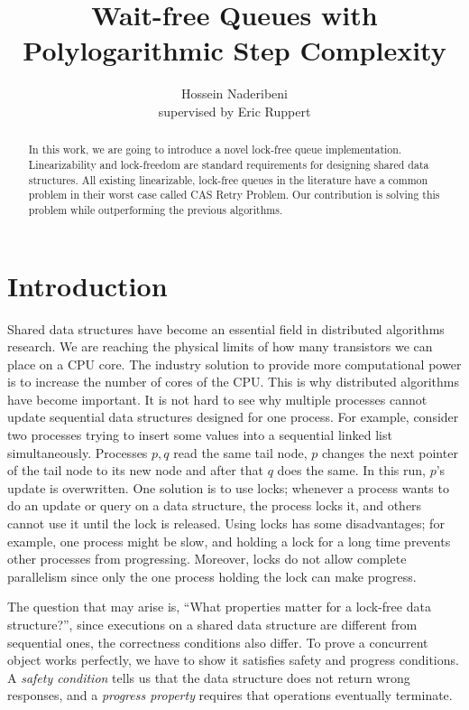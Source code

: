 \documentclass[10pt]{article}
\theoremstyle{definition}
\begin{document}
\title{Wait-free Queues with Polylogarithmic Step Complexity}
\author{Hossein Naderibeni \\supervised by Eric Ruppert}
\maketitle

\begin{abstract}
In this work, we are going to introduce a novel lock-free queue implementation.
Linearizability and lock-freedom are standard requirements for designing shared data structures. All existing linearizable, lock-free queues in the literature have a common problem in their worst case called CAS Retry Problem. Our contribution is solving this problem while outperforming the previous algorithms.
\end{abstract}

\tableofcontents
\pagebreak
\section{Introduction}
Shared data structures have become an essential field in distributed algorithms research.
We are reaching the physical limits of how many transistors we can place on a CPU core. The industry solution to provide more computational power is to increase the number of cores of the CPU. This is why distributed algorithms have become important. It is not hard to see why multiple processes cannot update sequential data structures designed for one process. For example, consider two processes trying to insert some values into a sequential linked list simultaneously. Processes $p,q$ read the same tail node, $p$ changes the next pointer of the tail node to its new node and after that $q$ does the same. In this run, $p$'s update is overwritten. One solution is to use locks; whenever a process wants to do an update or query on a data structure, the process locks it, and others cannot use it until the lock is released. Using locks has some disadvantages; for example, one process might be slow, and holding a lock for a long time prevents other processes from progressing. Moreover, locks do not allow complete parallelism since only the one process holding the lock can make progress. 


The question that may arise is, ``What properties matter for a lock-free data structure?'', since executions on a shared data structure are different from sequential ones, the correctness conditions also differ. To prove a concurrent object works perfectly, we have to show it satisfies safety and progress conditions. A \textit{safety condition} tells us that the data structure does not return wrong responses, and a \textit{progress property} requires that operations eventually terminate.
\end{document}
